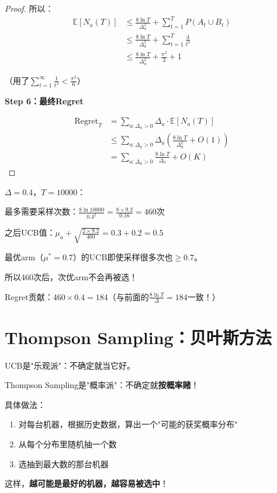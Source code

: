 \documentclass[11pt,a4paper]{article}
\theoremstyle{definition}
\begin{document}
\begin{proof}
所以：
\begin{align*}
\mathbb{E}[N_a(T)] &\leq \frac{8\ln T}{\Delta_a^2} + \sum_{t=1}^T P(A_t \cup B_t) \\
&\leq \frac{8\ln T}{\Delta_a^2} + \sum_{t=1}^T \frac{4}{t^3} \\
&\leq \frac{8\ln T}{\Delta_a^2} + \frac{\pi^2}{3} + 1
\end{align*}

（用了$\sum_{t=1}^\infty \frac{1}{t^3} < \frac{\pi^2}{6}$）

\textbf{Step 6：最终Regret}

\begin{align*}
\text{Regret}_T &= \sum_{a:\Delta_a > 0} \Delta_a \cdot \mathbb{E}[N_a(T)] \\
&\leq \sum_{a:\Delta_a > 0} \Delta_a \left(\frac{8\ln T}{\Delta_a^2} + O(1)\right) \\
&= \sum_{a:\Delta_a > 0} \frac{8\ln T}{\Delta_a} + O(K)
\end{align*}
\end{proof}

\begin{calculation}[验证证明中的数值]
$\Delta = 0.4$，$T = 10000$：

最多需要采样次数：$\frac{8\ln 10000}{0.4^2} = \frac{8 \times 9.2}{0.16} = 460$次

之后UCB值：$\mu_a + \sqrt{\frac{2 \times 9.2}{460}} = 0.3 + 0.2 = 0.5$

最优arm（$\mu^* = 0.7$）的UCB即使采样很多次也$\geq 0.7$。

所以460次后，次优arm不会再被选！

Regret贡献：$460 \times 0.4 = 184$（与前面的$\frac{8\ln T}{\Delta} = 184$一致！）
\end{calculation}

\section{Thompson Sampling：贝叶斯方法}

\begin{plainwords}
UCB是"乐观派"：不确定就当它好。

Thompson Sampling是"概率派"：不确定就\textbf{按概率赌}！

具体做法：
\begin{enumerate}
    \item 对每台机器，根据历史数据，算出一个"可能的获奖概率分布"
    \item 从每个分布里随机抽一个数
    \item 选抽到最大数的那台机器
\end{enumerate}

这样，\textbf{越可能是最好的机器，越容易被选中}！
\end{plainwords}
\end{document}

